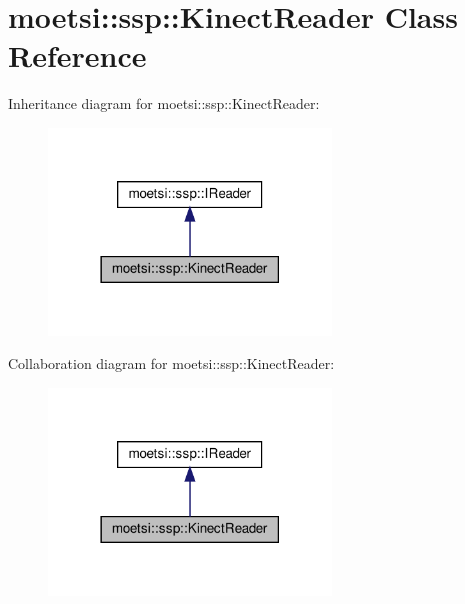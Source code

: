 \hypertarget{classmoetsi_1_1ssp_1_1KinectReader}{}\section{moetsi\+:\+:ssp\+:\+:Kinect\+Reader Class Reference}
\label{classmoetsi_1_1ssp_1_1KinectReader}


Inheritance diagram for moetsi\+:\+:ssp\+:\+:Kinect\+Reader\+:\nopagebreak
\begin{figure}[H]
\begin{center}
\leavevmode
\includegraphics[width=213pt]{classmoetsi_1_1ssp_1_1KinectReader__inherit__graph}
\end{center}
\end{figure}


Collaboration diagram for moetsi\+:\+:ssp\+:\+:Kinect\+Reader\+:\nopagebreak
\begin{figure}[H]
\begin{center}
\leavevmode
\includegraphics[width=213pt]{classmoetsi_1_1ssp_1_1KinectReader__coll__graph}
\end{center}
\end{figure}
